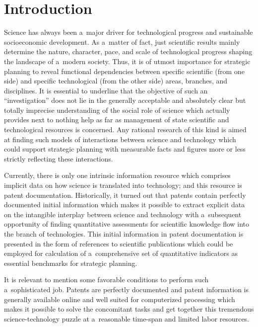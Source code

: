       \begin{multicols}{2}

                  \label{st\stat}

\section*{Introduction}

\noindent
    Science has always been a~major driver for technological progress and 
sustainable socioeconomic development. As a~matter of fact, just scientific results 
mainly determine the nature, character, pace, and scale of technological progress 
shaping the landscape of a~modern society. Thus, it is of utmost importance for 
strategic planning to reveal functional dependencies between specific scientific (from 
one side) and specific technological (from the other side) areas, branches, and 
disciplines. It is essential to underline that the objective of such an ``investigation'' 
does not lie in the generally acceptable and absolutely clear but totally imprecise 
understanding of the social role of science which actually provides next to nothing 
help as far as management of state scientific and technological resources is 
concerned. Any rational research of this kind is aimed at finding such models of 
interactions between science and technology which could support strategic planning 
with measurable facts and figures more or less strictly reflecting these interactions.
    
    Currently, there is only one intrinsic information resource which comprises 
implicit data on how science is translated into technology; and this resource is patent 
documentation. Historically, it turned out that patents contain perfectly documented 
initial information which makes it possible to extract explicit data on the intangible 
interplay between science and technology with a~subsequent opportunity of finding 
quantitative assessments for scientific knowledge flow into the branch of 
technologies. This initial information in patent documentation is presented in the 
form of references to scientific publications which could be employed 
for calculation of a~comprehensive set of quantitative indicators as essential benchmarks for strategic 
planning. 

It is relevant to mention some favorable conditions to perform such a~sophisticated 
job. Patents are perfectly documented and patent information is generally 
available online and well suited for computerized processing which makes it 
possible to solve the concomitant tasks and get together this tremendous  
science-technology puzzle at a~reasonable time-span and limited labor resources.


\end{multicols}

